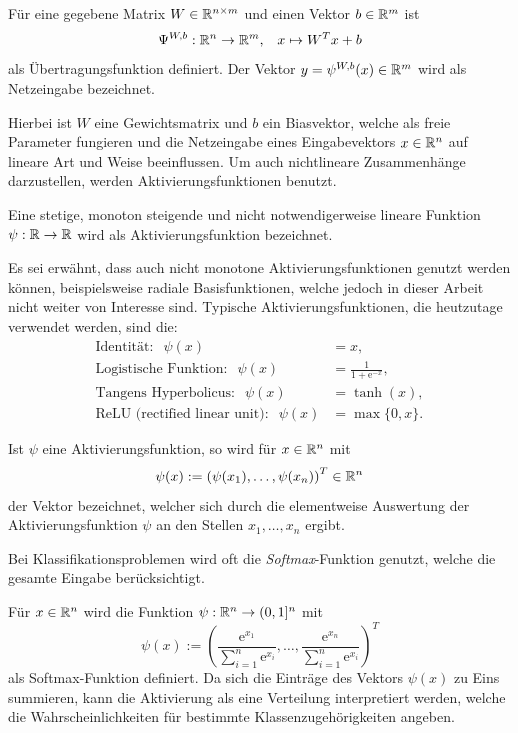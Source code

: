 \begin{defi}[Übertragungsfunktion]
    \label{def_net}
    Für eine gegebene Matrix $W \in \mathbb{R}^{n \times m}$ und einen Vektor $b \in \mathbb{R}^m$ ist 
    \[ 
    \Psi^{W,b}: \mathbb{R}^n \rightarrow \mathbb{R}^m, \; \; \; x \mapsto W^T x +b
    \]
    als Übertragungsfunktion definiert. Der Vektor $y=\psi^{W,b}(x) \in \mathbb{R}^m $ wird als Netzeingabe bezeichnet.
\end{defi}
Hierbei ist $W$ eine Gewichtsmatrix und $b$ ein Biasvektor, welche als freie Parameter fungieren und die Netzeingabe eines Eingabevektors $x \in \mathbb{R}^n$ auf lineare Art und Weise beeinflussen. Um auch nichtlineare Zusammenhänge darzustellen, werden Aktivierungsfunktionen benutzt.

\begin{defi}[Aktivierungsfunktion]
    \label{def_act_f}
    Eine stetige, monoton steigende und nicht notwendigerweise lineare Funktion $\psi: \mathbb{R} \rightarrow \mathbb{R}$ wird als Aktivierungsfunktion bezeichnet.
\end{defi}
Es sei erwähnt, dass auch nicht monotone Aktivierungsfunktionen genutzt werden können, beispielsweise radiale Basisfunktionen\cite{radialbasis}, welche jedoch in dieser Arbeit nicht weiter von Interesse sind.
Typische Aktivierungsfunktionen, die heutzutage verwendet werden, sind die:
\begin{align*}
    \text{Identität}: \; \;\psi(x)&=x, \\
    \text{Logistische Funktion}: \; \;\psi(x)&=\frac{1}{1+\mathrm{e}^{-x}}, \\
    \text{Tangens Hyperbolicus}: \; \;\psi(x)&=\tanh(x), \\
    \text{ReLU (rectified linear unit)}: \; \;\psi(x)&=\max\{0,x\}.
\end{align*}

\begin{bem}
    Ist $\psi$ eine Aktivierungsfunktion, so wird für $x \in \mathbb{R}^n$ mit 
    \[\psi(x):=\left(\psi(x_1), \ldots, \psi(x_n)\right)^T \in \mathbb{R}^n
    \]
    der Vektor bezeichnet, welcher sich durch die elementweise Auswertung der Aktivierungsfunktion $\psi$ an den Stellen $x_1, \ldots, x_n$ ergibt. 
\end{bem}

Bei Klassifikationsproblemen wird oft die \textit{Softmax}-Funktion\cite{denker1990transforming} genutzt, welche die gesamte Eingabe berücksichtigt. 

\begin{defi}[Softmax]
    Für $x \in \mathbb{R}^n$ wird die Funktion $\psi: \mathbb{R}^n \rightarrow (0,1]^n$ mit 
    \[
        \psi(x):=\left(\frac{\mathrm{e}^{x_1}}{\sum_{i=1}^n \mathrm{e}^{x_i}}, \ldots,\frac{\mathrm{e}^{x_n}}{\sum_{i=1}^n \mathrm{e}^{x_i}} \right)^T
    \]
    als Softmax-Funktion definiert. Da sich die Einträge des Vektors $\psi(x)$ zu Eins summieren, kann die Aktivierung als eine Verteilung interpretiert werden, welche die Wahrscheinlichkeiten für bestimmte Klassenzugehörigkeiten angeben.  
\end{defi}

